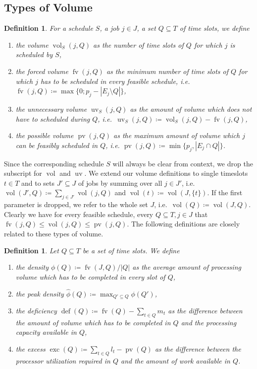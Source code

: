 \documentclass[a4paper]{article}
\DeclareMathOperator{\fv}{fv}
\DeclareMathOperator{\uv}{uv}
\DeclareMathOperator{\pv}{pv}
\DeclareMathOperator{\vol}{vol}
\DeclareMathOperator{\opdef}{def}
\DeclareMathOperator{\exc}{exc}
\newtheorem{definition}[theorem]{Definition}
\begin{document}
\subsection{Types of Volume}
\begin{definition}
  For a schedule $S$, a job $j \in J$, a set $Q \subseteq T$ of time slots, we define
  \begin{enumerate}
    \item
      the \emph{volume} $\vol_S(j, Q)$ as the number of time slots of $Q$ for which $j$ is scheduled by $S$,
    \item
      the \emph{forced volume} $\fv(j, Q)$ as the minimum number of time slots of $Q$ for which $j$ has to be scheduled in every feasible schedule, i.e.\ $\fv(j, Q) \coloneqq \max\{0; p_j - |E_j \setminus Q|\}$,
    \item
      the \emph{unnecessary volume} $\uv_S(j, Q)$ as the amount of volume which does not have to scheduled during $Q$, i.e.\ $\uv_S(j, Q) \coloneqq \vol_S(j, Q) - \fv(j,Q)$,
    \item
      the \emph{possible volume} $\pv(j, Q)$ as the maximum amount of volume which $j$ can be feasibly scheduled in $Q$, i.e.
    $\pv(j, Q) \coloneqq \min\{ p_j, | E_j \cap Q | \}$.
  \end{enumerate}
\end{definition}
Since the corresponding schedule $S$ will always be clear from context, we drop the subscript for $\vol$ and $\uv$.
We extend our volume definitions to single timeslots $t\in T$ and to sets $J' \subseteq J$ of jobs by summing over all $j \in J'$, i.e.
$\vol(J', Q) \coloneqq \sum_{j \in J'} \vol(j, Q)$ and
$\vol(t) \coloneqq \vol(J, \{t\})$.
If the first parameter is dropped, we refer to the whole set $J$, i.e.\ $\vol(Q) \coloneqq \vol(J, Q)$.
Clearly we have for every feasible schedule, every $Q \subseteq T, j \in J$ that $\fv(j, Q) \leq \vol(j, Q) \leq \pv(j, Q)$.
The following definitions are closely related to these types of volume.
\begin{definition}
  Let $Q \subseteq T$ be a set of time slots.
  We define
  \begin{enumerate}
    \item
      the \emph{density} $\phi(Q) \coloneqq \fv(J, Q) / |Q|$ as the average amount of processing volume which has to be completed in every slot of $Q$,
    \item
      the \emph{peak density} $\hat \phi(Q) \coloneqq \max_{Q' \subseteq Q} \phi(Q')$,
    \item
      the \emph{deficiency} $\opdef(Q) \coloneqq \fv(Q) - \sum_{t \in Q} m_t$ as the difference between the amount of volume which has to be completed in $Q$ and the processing capacity available in $Q$,
    \item
      the \emph{excess} $\exc(Q) \coloneqq \sum_{t \in Q} l_t - \pv(Q)$ as the difference between the processor utilization required in $Q$ and the amount of work available in $Q$.
  \end{enumerate}
\end{definition}
\end{document}
